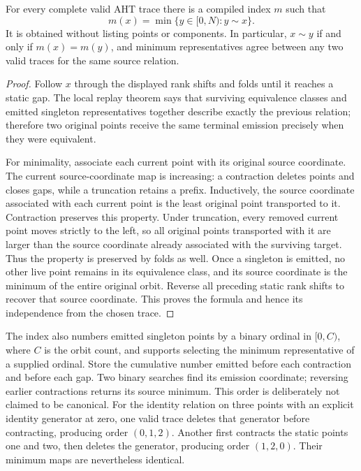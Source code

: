 \begin{theorem}
For every complete valid AHT trace there is a compiled index $m$ such that
\[
 m(x)=\min\{y\in[0,N):y\sim x\}.
\]
It is obtained without listing points or components.  In particular,
$x\sim y$ if and only if $m(x)=m(y)$, and minimum representatives agree
between any two valid traces for the same source relation.
\end{theorem}
\begin{proof}
Follow $x$ through the displayed rank shifts and folds until it reaches
a static gap.  The local replay theorem says that surviving equivalence
classes and emitted singleton representatives together describe exactly
the previous relation; therefore two original points receive the same
terminal emission precisely when they were equivalent.

For minimality, associate each current point with its original source
coordinate.  The current source-coordinate map is increasing: a contraction
deletes points and closes gaps, while a truncation retains a prefix.
Inductively, the source coordinate associated with each current point is
the least original point transported to it.  Contraction preserves this
property.  Under truncation, every removed current point moves strictly to
the left, so all original points transported with it are larger than the
source coordinate already associated with the surviving target.  Thus the
property is preserved by folds as well.  Once a singleton is emitted, no
other live point remains in its equivalence class, and its source coordinate
is the minimum of the entire original orbit.  Reverse all preceding static
rank shifts to recover that source coordinate.  This proves the formula
and hence its independence from the chosen trace.
\end{proof}

The index also numbers emitted singleton points by a binary ordinal in
$[0,C)$, where $C$ is the orbit count, and supports selecting the minimum
representative of a supplied ordinal.  Store the cumulative number emitted
before each contraction and before each gap.  Two binary searches find its
emission coordinate; reversing earlier contractions returns its source
minimum.  This order is deliberately not claimed to be canonical.  For the
identity relation on three points with an explicit identity generator at
zero, one valid trace deletes that generator before contracting, producing
order $(0,1,2)$.  Another first contracts the static points one and two,
then deletes the generator, producing order $(1,2,0)$.  Their minimum maps
are nevertheless identical.

